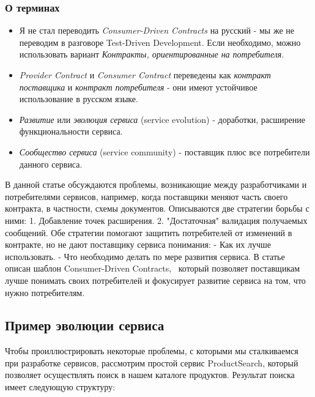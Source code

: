 \documentclass[11pt]{article}
\providecommand{\tightlist}{%
      \setlength{\itemsep}{0pt}\setlength{\parskip}{0pt}}
\begin{document}
\subsubsection{О
терминах}\label{ux43e-ux442ux435ux440ux43cux438ux43dux430ux445}

\begin{itemize}
\tightlist
\item
  Я не стал переводить \emph{Consumer-Driven Contracts} на русский - мы
  же не переводим в разговоре Test-Driven Development. Если необходимо,
  можно использовать вариант \emph{Контракты, ориентированные на
  потребителя}.
\item
  \emph{Provider Contract} и \emph{Consumer Contract} переведены как
  \emph{контракт поставщика} и \emph{контракт потребителя} - они имеют
  устойчивое использование в русском языке.
\item
  \emph{Развитие} или \emph{эволюция сервиса} (service evolution) -
  доработки, расширение функциональности сервиса.
\item
  \emph{Сообщество сервиса} (service community) - поставщик плюс все
  потребители данного сервиса.
\end{itemize}

В данной статье обсуждаются проблемы, возникающие между разработчиками и
потребителями сервисов, например, когда поставщики меняют часть своего
контракта, в частности, схемы документов. Описываются две стратегии
борьбы с ними: 1. Добавление точек расширения. 2. "Достаточная"
валидация получаемых сообщений. Обе стратегии помогают защитить
потребителей от изменений в контракте, но не дают поставщику сервиса
понимания: - Как их лучше использовать. - Что необходимо делать по мере
развития сервиса. В статье описан шаблон Consumer-Driven Contracts,
~который позволяет поставщикам лучше понимать своих потребителей и
фокусирует развитие сервиса на том, что нужно потребителям.

    \subsection{Пример эволюции
сервиса}\label{ux43fux440ux438ux43cux435ux440-ux44dux432ux43eux43bux44eux446ux438ux438-ux441ux435ux440ux432ux438ux441ux430}

Чтобы проиллюстрировать некоторые проблемы, с которыми мы сталкиваемся
при разработке сервисов, рассмотрим простой сервис ProductSearch,
который позволяет осуществлять поиск в нашем каталоге продуктов.
Результат поиска имеет следующую структуру:
\end{document}
